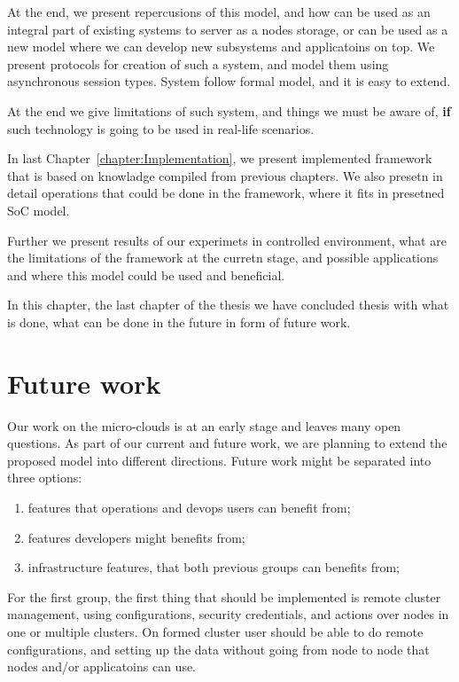 At the end, we present repercusions of this model, and how can be used as an integral part of existing systems to server as a nodes storage, or can be used as a new model where we can develop new subsystems and applicatoins on top. We present protocols for creation of such a system, and model them using asynchronous session types. System follow formal model, and it is easy to extend.

At the end we give limitations of such system, and things we must be aware of, \textbf{if} such technology is going to be used in real-life scenarios.

In last Chapter~\ref{chapter:Implementation}, we present implemented framework that is based on knowladge compiled from previous chapters. We also presetn in detail operations that could be done in the framework, where it fits in presetned SoC model.

Further we present results of our experimets in controlled environment, what are the limitations of the framework at the curretn stage, and possible applications and where this model could be used and beneficial.

In this chapter, the last chapter of the thesis we have concluded thesis with what is done, what can be done in the future in form of future work.
%
%
\section{Future work}\label{sec:future_work}
%
Our work on the micro-clouds is at an early stage and leaves many open questions. As part of our current and future work, we are planning to extend the proposed model into different directions. Future work might be separated into three options:
 
\begin{enumerate}[start=1,label={(\bfseries \arabic*)}]
	\item features that operations and devops users can benefit from;
	\item features developers might benefits from;
	\item infrastructure features, that both previous groups can benefits from;
\end{enumerate}

For the first group, the first thing that should be implemented is remote cluster management, using configurations, security credentials, and actions over nodes in one or multiple clusters. On formed cluster user should be able to do remote configurations, and setting up the data without going from node to node that nodes and/or applicatoins can use.

